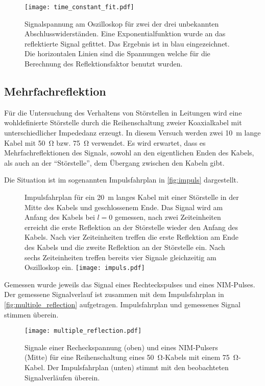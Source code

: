 \begin{figure}
  \centering
  \texttt{[image: time\_constant\_fit.pdf]}
  \caption{%
    Signalspannung am Oszilloskop für zwei der drei unbekannten Abschlusswiderständen. Eine Exponentialfunktion wurde an das reflektierte Signal
    gefittet. Das Ergebnis ist in blau eingezeichnet. Die horizontalen Linien sind die Spannungen welche für die Berechnung des Reflektionsfaktor
    benutzt wurden.
  }\label{fig:fit}
\end{figure}
\subsection{Mehrfachreflektion}

Für die Untersuchung des Verhaltens von Störstellen in Leitungen wird eine wohldefinierte
Störstelle durch die Reihenschaltung zweier Koaxialkabel mit unterschiedlicher Impededanz
erzeugt.
In diesem Versuch werden zwei \SI{10}{\meter} lange Kabel mit \SI{50}{\ohm} bzw. \SI{75}{\ohm} verwendet.
Es wird erwartet, dass es Mehrfachreflektionen des Signals, sowohl an den eigentlichen Enden
des Kabels, als auch an der \enquote{Störstelle}, dem Übergang zwischen den Kabeln gibt.

Die Situation ist im sogenannten Impulsfahrplan in \autoref{fig:impuls} dargestellt.

\begin{figure}
  \captionsetup{format=plain}
  \begin{captionbeside}{%
      Impulsfahrplan für ein \SI{20}{\meter} langes Kabel mit einer Störstelle in
      der Mitte des Kabels und geschlossenem Ende.
      Das Signal wird am  Anfang des Kabels bei $l = 0$ gemessen, nach zwei Zeiteinheiten
      erreicht die erste Reflektion an der Störstelle wieder den Anfang des Kabels.
      Nach vier Zeiteinheiten treffen die erste Reflektion am Ende des Kabels und die
      zweite Reflektion an der Störstelle ein. Nach sechs Zeiteinheiten treffen bereits vier
      Signale gleichzeitig am Oszilloskop ein.
    }%
    \texttt{[image: impuls.pdf]}
  \end{captionbeside}\label{fig:impuls}
\end{figure}

Gemessen wurde jeweils das Signal eines Rechteckspulses und eines NIM-Pulses.
Der gemessene Signalverlauf ist zusammen mit dem Impulsfahrplan in \autoref{fig:multiple_reflection} aufgetragen.
Impulsfahrplan und gemessenes Signal stimmen überein.

\begin{figure}
  \centering
  \texttt{[image: multiple\_reflection.pdf]}
  \caption{%
    Signale einer Recheckspannung (oben) und eines NIM-Pulsers (Mitte) für eine Reihenschaltung eines \SI{50}{\ohm}-Kabels mit einem \SI{75}{\ohm}-Kabel.
    Der Impulsfahrplan (unten) stimmt mit den beobachteten Signalverläufen überein.
  }\label{fig:multiple_reflection}
\end{figure}

